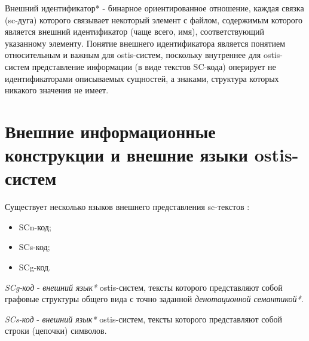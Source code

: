 Внешний идентификатор* - бинарное ориентированное отношение, каждая связка (sc-дуга) которого связывает некоторый элемент с файлом, содержимым которого является внешний идентификатор (чаще всего, имя), соответствующий указанному элементу. Понятие внешнего идентификатора является понятием относительным и важным для ostis-систем, поскольку внутреннее для ostis-систем представление информации (в виде текстов SC-кода) оперирует не идентификаторами описываемых сущностей, а знаками, структура которых никакого значения не имеет.

\section{Внешние информационные конструкции и внешние языки ostis-систем}
\label{sec_external_information_constructs_external_lang}

Существует несколько языков внешнего представления sc-текстов :

\begin{itemize}
    \item SCn-код;
    \item SCs-код;
    \item SCg-код.
\end{itemize}

\textit{SCg-код} - \textit{внешний язык*} ostis-систем, тексты которого представляют собой графовые структуры общего вида с точно заданной \textit{денотационной семантикой*}.

\begin{SCn}

    \begin{scnindent}
    \end{scnindent}

\end{SCn}

\textit{SCs-код} - \textit{внешний язык*} ostis-систем, тексты которого представляют собой строки (цепочки) символов.

\begin{SCn}

    \begin{scnindent}
    \end{scnindent}

\end{SCn}

